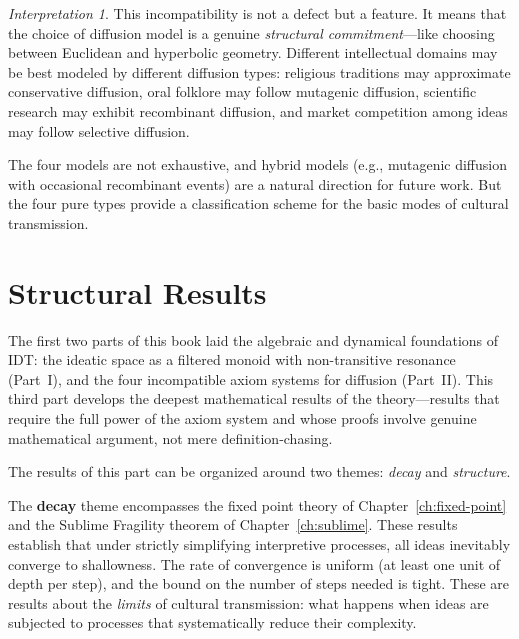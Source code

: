 \documentclass[11pt,openany]{book}
\theoremstyle{definition}
\theoremstyle{plain}
\theoremstyle{remark}
\newtheorem{interpretation}[axiom]{Interpretation}
\begin{document}
\begin{interpretation}
This incompatibility is not a defect but a feature. It means that the choice of diffusion model is a genuine \emph{structural commitment}---like choosing between Euclidean and hyperbolic geometry. Different intellectual domains may be best modeled by different diffusion types: religious traditions may approximate conservative diffusion, oral folklore may follow mutagenic diffusion, scientific research may exhibit recombinant diffusion, and market competition among ideas may follow selective diffusion.

The four models are not exhaustive, and hybrid models (e.g., mutagenic diffusion with occasional recombinant events) are a natural direction for future work. But the four pure types provide a classification scheme for the basic modes of cultural transmission.
\end{interpretation}


\part{Structural Results}

The first two parts of this book laid the algebraic and dynamical foundations of IDT: the ideatic space as a filtered monoid with non-transitive resonance (Part~I), and the four incompatible axiom systems for diffusion (Part~II). This third part develops the deepest mathematical results of the theory---results that require the full power of the axiom system and whose proofs involve genuine mathematical argument, not mere definition-chasing.

The results of this part can be organized around two themes: \emph{decay} and \emph{structure}.

The \textbf{decay} theme encompasses the fixed point theory of Chapter~\ref{ch:fixed-point} and the Sublime Fragility theorem of Chapter~\ref{ch:sublime}. These results establish that under strictly simplifying interpretive processes, all ideas inevitably converge to shallowness. The rate of convergence is uniform (at least one unit of depth per step), and the bound on the number of steps needed is tight. These are results about the \emph{limits} of cultural transmission: what happens when ideas are subjected to processes that systematically reduce their complexity.
\end{document}
